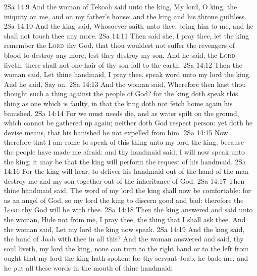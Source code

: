 \vs 2Sa 14:9 And the woman of Tekoah said unto the king, My lord, O king, the iniquity  on me, and on my father's house: and the king and his throne  guiltless.
\vs 2Sa 14:10 And the king said, Whosoever saith  unto thee, bring him to me, and he shall not touch thee any more.
\vs 2Sa 14:11 Then said she, I pray thee, let the king remember the \textsc{Lord} thy God, that thou wouldest not suffer the revengers of blood to destroy any more, lest they destroy my son. And he said,  the \textsc{Lord} liveth, there shall not one hair of thy son fall to the earth.
\vs 2Sa 14:12 Then the woman said, Let thine handmaid, I pray thee, speak  word unto my lord the king. And he said, Say on.
\vs 2Sa 14:13 And the woman said, Wherefore then hast thou thought such a thing against the people of God? for the king doth speak this thing as one which is faulty, in that the king doth not fetch home again his banished.
\vs 2Sa 14:14 For we must needs die, and  as water spilt on the ground, which cannot be gathered up again; neither doth God respect  person: yet doth he devise means, that his banished be not expelled from him.
\vs 2Sa 14:15 Now therefore that I am come to speak of this thing unto my lord the king,  because the people have made me afraid: and thy handmaid said, I will now speak unto the king; it may be that the king will perform the request of his handmaid.
\vs 2Sa 14:16 For the king will hear, to deliver his handmaid out of the hand of the man  destroy me and my son together out of the inheritance of God.
\vs 2Sa 14:17 Then thine handmaid said, The word of my lord the king shall now be comfortable: for as an angel of God, so  my lord the king to discern good and bad: therefore the \textsc{Lord} thy God will be with thee.
\vs 2Sa 14:18 Then the king answered and said unto the woman, Hide not from me, I pray thee, the thing that I shall ask thee. And the woman said, Let my lord the king now speak.
\vs 2Sa 14:19 And the king said,  the hand of Joab with thee in all this? And the woman answered and said,  thy soul liveth, my lord the king, none can turn to the right hand or to the left from ought that my lord the king hath spoken: for thy servant Joab, he bade me, and he put all these words in the mouth of thine handmaid:
